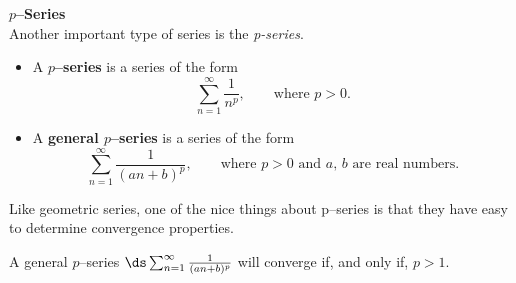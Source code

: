 \noindent\textbf{\large $p$--Series}\\

Another important type of series is the \emph{p-series}.

{\begin{itemize}
\item	A \textbf{$p$--series} is a series of the form $$\sum_{n=1}^\infty \frac{1}{n^p}, \qquad \text{where $p>0$.}$$

\item	A \textbf{general $p$--series} is a series of the form $$\sum_{n=1}^\infty \frac{1}{(an+b)^p}, \qquad \text{where $p>0$ and $a$, $b$ are real numbers.}$$
\end{itemize}
}

Like geometric series, one of the nice things about p--series is that they have easy to determine convergence properties.

{A general $p$--series $\ds\sum_{n=1}^\infty \frac{1}{(an+b)^p}$ will converge if, and only if, $p>1$.
}

